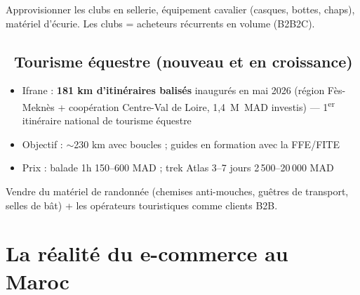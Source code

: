\documentclass[11pt,a4paper]{article}
\begin{document}
\begin{actionbox}
Approvisionner les clubs en sellerie, équipement cavalier (casques, bottes, chaps), matériel d'écurie. Les clubs = acheteurs récurrents en volume (B2B2C).
\end{actionbox}

\subsection{\faSuitcase\ Tourisme équestre (nouveau et en croissance)}
\begin{itemize}
  \item Ifrane : \textbf{181 km d'itinéraires balisés} inaugurés en mai 2026 (région Fès-Meknès + coopération Centre-Val de Loire, 1,4~M~MAD investis) --- 1\textsuperscript{er} itinéraire national de tourisme équestre
  \item Objectif : $\sim$230 km avec boucles ; guides en formation avec la FFE/FITE
  \item Prix : balade 1h 150--600 MAD ; trek Atlas 3--7 jours 2\,500--20\,000 MAD
\end{itemize}

\begin{actionbox}
Vendre du matériel de randonnée (chemises anti-mouches, guêtres de transport, selles de bât) + les opérateurs touristiques comme clients B2B.
\end{actionbox}

\section{La réalité du e-commerce au Maroc}
\end{document}

